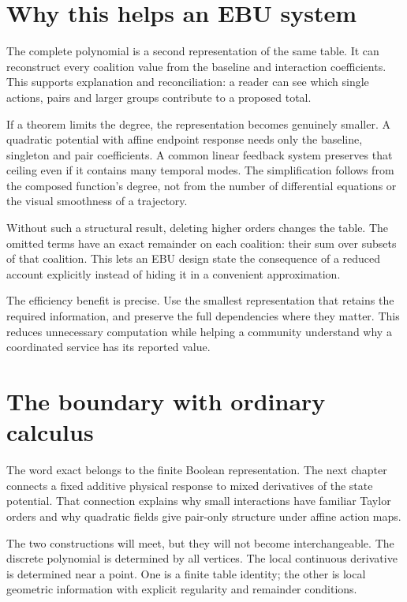 \section{Why this helps an EBU system}
The complete polynomial is a second representation of the same table. It can reconstruct every coalition value from the baseline and interaction coefficients. This supports explanation and reconciliation: a reader can see which single actions, pairs and larger groups contribute to a proposed total.

If a theorem limits the degree, the representation becomes genuinely smaller. A quadratic potential with affine endpoint response needs only the baseline, singleton and pair coefficients. A common linear feedback system preserves that ceiling even if it contains many temporal modes. The simplification follows from the composed function's degree, not from the number of differential equations or the visual smoothness of a trajectory.

Without such a structural result, deleting higher orders changes the table. The omitted terms have an exact remainder on each coalition: their sum over subsets of that coalition. This lets an EBU design state the consequence of a reduced account explicitly instead of hiding it in a convenient approximation.

The efficiency benefit is precise. Use the smallest representation that retains the required information, and preserve the full dependencies where they matter. This reduces unnecessary computation while helping a community understand why a coordinated service has its reported value.

\section{The boundary with ordinary calculus}
The word exact belongs to the finite Boolean representation. The next chapter connects a fixed additive physical response to mixed derivatives of the state potential. That connection explains why small interactions have familiar Taylor orders and why quadratic fields give pair-only structure under affine action maps.

The two constructions will meet, but they will not become interchangeable. The discrete polynomial is determined by all vertices. The local continuous derivative is determined near a point. One is a finite table identity; the other is local geometric information with explicit regularity and remainder conditions.
